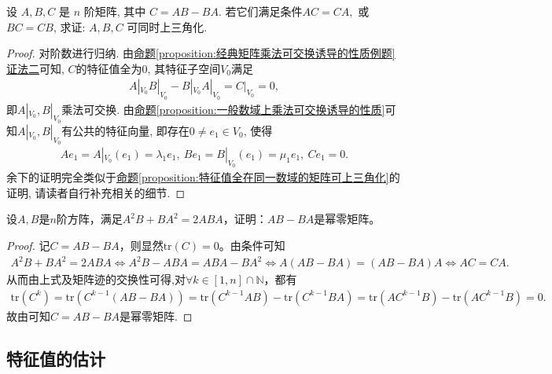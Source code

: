 \documentclass[../../main.tex]{subfiles}
\begin{document}
\begin{corollary}\label{proposition:经典矩阵乘法可交换诱导的性质例题推论}
设 \(A, B, C\) 是 \(n\) 阶矩阵, 其中 \(C = AB - BA\). 若它们满足条件$AC = CA,$ 或 $BC = CB$, 求证: \(A,B,C\) 可同时上三角化.
\end{corollary}
\begin{proof}
对阶数进行归纳. 由\hyperref[proposition:经典矩阵乘法可交换诱导的性质例题]{命题\ref{proposition:经典矩阵乘法可交换诱导的性质例题}证法二}可知, \(C\)的特征值全为\(0\), 其特征子空间\(V_{0}\)满足
\begin{align*}
A|_{V_{0}}B|_{V_{0}} - B|_{V_{0}}A|_{V_{0}}=C|_{V_{0}} = 0,
\end{align*}
即\(A|_{V_{0}},B|_{V_{0}}\)乘法可交换. 由\hyperref[proposition:一般数域上乘法可交换诱导的性质]{命题\ref{proposition:一般数域上乘法可交换诱导的性质}}可知\(A|_{V_{0}},B|_{V_{0}}\)有公共的特征向量, 即存在\(0\neq e_{1} \in V_{0}\), 使得
\begin{align*}
Ae_{1}=A|_{V_{0}}(e_{1})=\lambda_{1}e_{1},\ Be_{1}=B|_{V_{0}}(e_{1})=\mu_{1}e_{1},\ Ce_{1}=0.
\end{align*}
余下的证明完全类似于\hyperref[proposition:特征值全在同一数域的矩阵可上三角化]{命题\ref{proposition:特征值全在同一数域的矩阵可上三角化}}的证明, 请读者自行补充相关的细节.

\end{proof}

\begin{example}
设$A,B$是$n$阶方阵，满足$A^2B + BA^2 = 2ABA$，证明：$AB - BA$是幂零矩阵。 
\end{example}
\begin{proof}
记$C = AB - BA$，则显然$\mathrm{tr}(C)=0$。由条件可知
\begin{align*}
A^2B + BA^2 = 2ABA \Longleftrightarrow A^2B - ABA = ABA - BA^2 
\Longleftrightarrow A(AB - BA) = (AB - BA)A \Longleftrightarrow AC = CA.
\end{align*}
从而由上式及矩阵迹的交换性可得,对$\forall k\in [1,n]\cap \mathbb{N}$，都有
\begin{align*}
\mathrm{tr}(C^k) = \mathrm{tr}(C^{k - 1}(AB - BA)) = \mathrm{tr}(C^{k - 1}AB) - \mathrm{tr}(C^{k - 1}BA) 
= \mathrm{tr}(AC^{k - 1}B) - \mathrm{tr}(AC^{k - 1}B) = 0.
\end{align*}
故由可知$C=AB-BA$是幂零矩阵.

\end{proof}



\subsection{特征值的估计}
\end{document}
